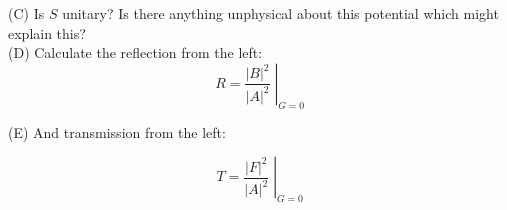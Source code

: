 \documentclass[12pt]{article}
\begin{document}
\noindent
(C) Is $S$ unitary? Is there anything unphysical about this potential which might explain this?\\

\noindent
(D) Calculate the reflection from the left:
$$R = \left. \frac{|B|^2}{|A|^2} \; \right\rvert_{G=0} $$

\noindent
(E) And transmission from the left:

$$T = \left. \frac{|F|^2}{|A|^2} \; \right\rvert_{G=0} $$
\end{document}
